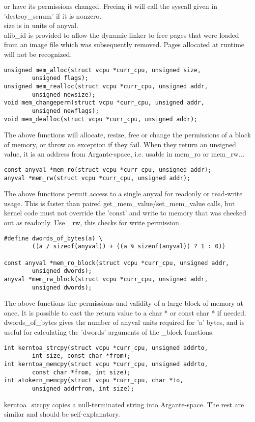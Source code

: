 \documentclass[a4paper,oneside,openany]{book}
\begin{document}
or have its permissions changed. Freeing it will call the syscall given in
'destroy\_scnum' if it is nonzero.\smallskip\\
size is in units of anyval.\smallskip\\
alib\_id is provided to allow the dynamic linker to free pages that were loaded
from an image file which was subsequently removed. Pages allocated at runtime will
not be recognized.
\begin{verbatim}
unsigned mem_alloc(struct vcpu *curr_cpu, unsigned size,
        unsigned flags);
unsigned mem_realloc(struct vcpu *curr_cpu, unsigned addr,
        unsigned newsize);
void mem_changeperm(struct vcpu *curr_cpu, unsigned addr,
        unsigned newflags);
void mem_dealloc(struct vcpu *curr_cpu, unsigned addr);
\end{verbatim}
The above functions will allocate, resize, free or change the permissions of a block
of memory, or throw an exception if they fail. When they return an unsigned value,
it is an address from Argante-space, i.e. usable in mem\_ro or mem\_rw...
\begin{verbatim}
const anyval *mem_ro(struct vcpu *curr_cpu, unsigned addr);
anyval *mem_rw(struct vcpu *curr_cpu, unsigned addr);
\end{verbatim}
The above functions permit access to a single anyval for readonly or read-write usage.
This is faster than paired get\_mem\_value/set\_mem\_value calls, but kernel code must
not override the 'const' and write to memory that was checked out as readonly. Use \_rw,
this checks for write permission.
\begin{verbatim}
#define dwords_of_bytes(a) \
        ((a / sizeof(anyval)) + ((a % sizeof(anyval)) ? 1 : 0))

const anyval *mem_ro_block(struct vcpu *curr_cpu, unsigned addr,
        unsigned dwords);
anyval *mem_rw_block(struct vcpu *curr_cpu, unsigned addr,
        unsigned dwords);
\end{verbatim}
The above functions the permissions and validity of a large block of memory at once. It is
possible to cast the return value to a char * or const char * if needed.\smallskip\\
dwords\_of\_bytes gives the number of anyval units required for 'a' bytes, and is useful
for calculating the 'dwords' arguments of the \_block functions.
\begin{verbatim}
int kerntoa_strcpy(struct vcpu *curr_cpu, unsigned addrto,
        int size, const char *from);
int kerntoa_memcpy(struct vcpu *curr_cpu, unsigned addrto,
        const char *from, int size);
int atokern_memcpy(struct vcpu *curr_cpu, char *to,
        unsigned addrfrom, int size);
\end{verbatim}
kerntoa\_strcpy copies a null-terminated string into Argante-space. The rest are
similar and should be self-explanatory.
\end{document}

